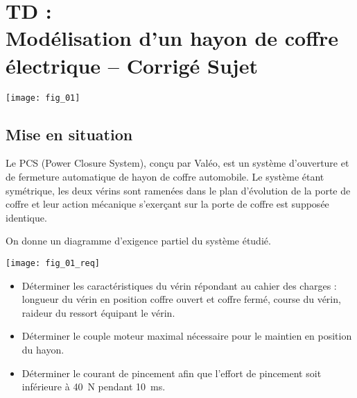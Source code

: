 \chapter*{TD  :\\ 
Modélisation d'un hayon de coffre électrique -- \ifprof Corrigé \else Sujet \fi}

\iflivret {} \else
\ifprof  {} \else \fi
\fi

\setcounter{question}{0}

\begin{marginfigure}
\texttt{[image: fig\_01]}
\end{marginfigure}


\section*{Mise en situation}
\ifprof
\else
Le PCS (Power Closure System), conçu par Valéo, est un système d’ouverture et de fermeture automatique de
hayon de coffre automobile.
Le système étant symétrique, les deux vérins sont ramenées dans 
le plan d’évolution de la porte de coffre et leur action mécanique s’exerçant sur la porte de coffre est supposée identique.

On donne un diagramme d'exigence partiel du système étudié. 

\begin{marginfigure}
\texttt{[image: fig\_01\_req]}
\end{marginfigure}


\begin{obj}
\begin{itemize}
\item Déterminer les caractéristiques du vérin répondant au cahier des charges : longueur
du vérin en position coffre ouvert et coffre fermé, course du vérin, raideur du ressort équipant le vérin. 
\item Déterminer le couple moteur maximal nécessaire pour le maintien en position du hayon.
\item Déterminer le courant de pincement afin que l'effort de pincement soit inférieure à \SI{40}{N} pendant \SI{10}{ms}.
\end{itemize}
\end{obj}




